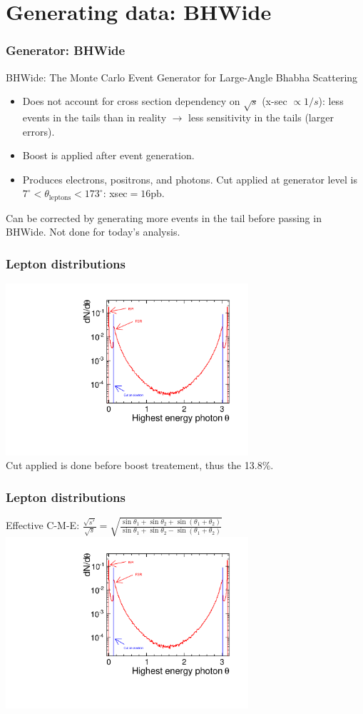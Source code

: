 \documentclass{beamer}
\begin{document}
\section{Generating data: BHWide}
\begin{frame}
\frametitle{Generator: BHWide}
BHWide: The Monte Carlo Event Generator for Large-Angle Bhabha Scattering
\begin{itemize}
  \item Does not account for cross section dependency on $\sqrt{s}$ 
  (x-sec $\propto 1/s$): less events in the tails than in reality
  $\to$ less sensitivity in the tails (larger errors).
  \item Boost is applied after event generation.
  \item Produces electrons, positrons, and photons. \alert{Cut applied at
  generator level is  $7^\circ<\theta_{\textrm{leptons}}<173^\circ$}:
  xsec$=16\textrm{pb}$.
\end{itemize}
Can be corrected by generating more events in the tail before passing in BHWide.
Not done for today's analysis.
\end{frame}
\begin{frame}
\frametitle{Lepton distributions}
\includegraphics[width=9cm,page=7]{BHWideAnalysis.pdf}\\
Cut applied is done before boost treatement, thus the 13.8\%.
\end{frame}
\begin{frame}
\frametitle{Lepton distributions}
Effective C-M-E:
$\frac{\sqrt{s'}}{\sqrt{s}}=\sqrt{\frac{\sin\theta_1+\sin\theta_2+\sin(\theta_1+\theta_2)}{\sin\theta_1+\sin\theta_2-\sin(\theta_1+\theta_2)}}$\\
\includegraphics[width=9cm,page=8]{BHWideAnalysis.pdf}
\end{frame}
\end{document}
